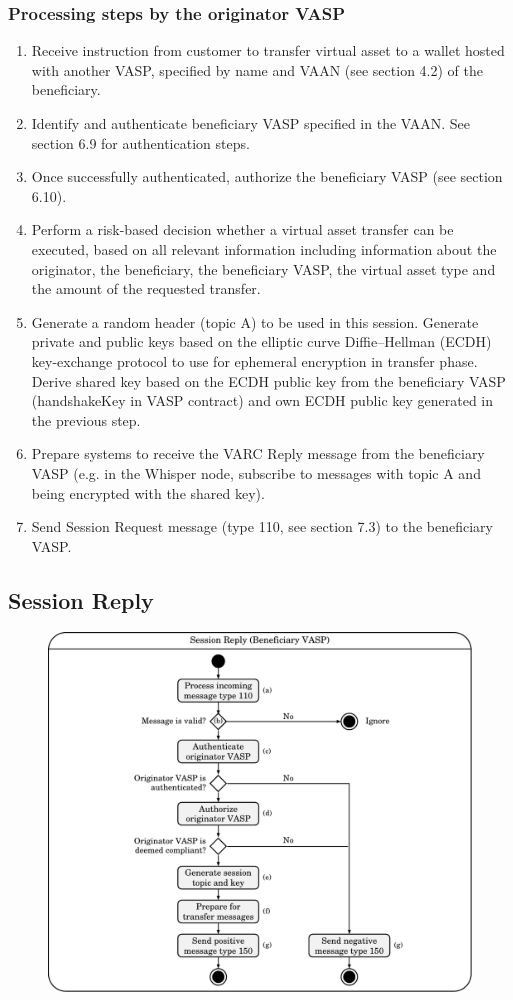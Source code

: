 \documentclass{article}
\begin{document}
\subsubsection{Processing steps by the originator VASP}
\begin{enumerate}
    \item Receive instruction from customer to transfer virtual asset to a wallet hosted with another VASP, specified by name and VAAN (see section 4.2) of the beneficiary.
    \item Identify and authenticate beneficiary VASP specified in the VAAN. See section 6.9 for authentication steps.
    \item Once successfully authenticated, authorize the beneficiary VASP (see section 6.10).
    \item Perform a risk-based decision whether a virtual asset transfer can be executed, based on all relevant information including information about the originator, the beneficiary, the beneficiary VASP, the virtual asset type and the amount of the requested transfer.
    \item Generate a random header (topic A) to be used in this session. Generate private and public keys based on the elliptic curve Diffie–Hellman (ECDH) key-exchange protocol to use for ephemeral encryption in transfer phase. Derive shared key based on the ECDH public key from the beneficiary VASP (handshakeKey in VASP contract) and own ECDH public key generated in the previous step.
    \item Prepare systems to receive the VARC Reply message from the beneficiary VASP (e.g. in the Whisper node, subscribe to messages with topic A and being encrypted with the shared key).
    \item Send Session Request message (type 110, see section 7.3) to the beneficiary VASP.
\end{enumerate}

\subsection{Session Reply}
\begin{figure}[h]
    \centering
    \includegraphics[width=\textwidth]{g10.pdf}
\end{figure}
\end{document}

